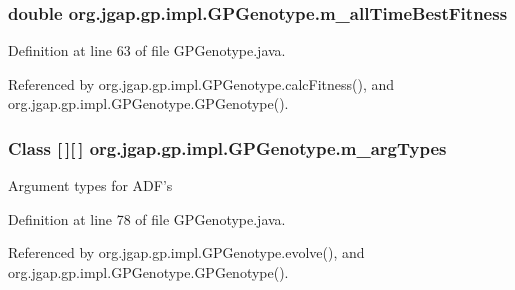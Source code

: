 \hypertarget{classorg_1_1jgap_1_1gp_1_1impl_1_1_g_p_genotype_a869b5d4ab431717009978a9d870bf5d8}{
\subsubsection[{m\-\_\-all\-Time\-Best\-Fitness}]{\setlength{\rightskip}{0pt plus 5cm}double org.\-jgap.\-gp.\-impl.\-G\-P\-Genotype.\-m\-\_\-all\-Time\-Best\-Fitness\hspace{0.3cm}{\ttfamily [private]}}}\label{classorg_1_1jgap_1_1gp_1_1impl_1_1_g_p_genotype_a869b5d4ab431717009978a9d870bf5d8}


Definition at line 63 of file G\-P\-Genotype.\-java.



Referenced by org.\-jgap.\-gp.\-impl.\-G\-P\-Genotype.\-calc\-Fitness(), and org.\-jgap.\-gp.\-impl.\-G\-P\-Genotype.\-G\-P\-Genotype().

\hypertarget{classorg_1_1jgap_1_1gp_1_1impl_1_1_g_p_genotype_a8e26c3d41a0e1922310e9d966f80238f}{
\subsubsection[{m\-\_\-arg\-Types}]{\setlength{\rightskip}{0pt plus 5cm}Class \mbox{[}$\,$\mbox{]}\mbox{[}$\,$\mbox{]} org.\-jgap.\-gp.\-impl.\-G\-P\-Genotype.\-m\-\_\-arg\-Types\hspace{0.3cm}{\ttfamily [private]}}}\label{classorg_1_1jgap_1_1gp_1_1impl_1_1_g_p_genotype_a8e26c3d41a0e1922310e9d966f80238f}
Argument types for A\-D\-F's 

Definition at line 78 of file G\-P\-Genotype.\-java.



Referenced by org.\-jgap.\-gp.\-impl.\-G\-P\-Genotype.\-evolve(), and org.\-jgap.\-gp.\-impl.\-G\-P\-Genotype.\-G\-P\-Genotype().

